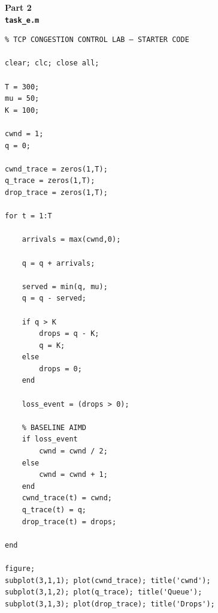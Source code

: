 \documentclass[a4paper,12pt]{article}
\begin{document}
\noindent
\textbf{Part 2}\\
\textbf{\texttt{task\_e.m}}
\begin{lstlisting}
% TCP CONGESTION CONTROL LAB – STARTER CODE

clear; clc; close all;

T = 300;
mu = 50;
K = 100;

cwnd = 1;
q = 0;

cwnd_trace = zeros(1,T);
q_trace = zeros(1,T);
drop_trace = zeros(1,T);

for t = 1:T

    arrivals = max(cwnd,0);

    q = q + arrivals;

    served = min(q, mu);
    q = q - served;

    if q > K
        drops = q - K;
        q = K;
    else
        drops = 0;
    end

    loss_event = (drops > 0);

    % BASELINE AIMD
    if loss_event
        cwnd = cwnd / 2;
    else
        cwnd = cwnd + 1;
    end
    cwnd_trace(t) = cwnd;
    q_trace(t) = q;
    drop_trace(t) = drops;

end

figure;
subplot(3,1,1); plot(cwnd_trace); title('cwnd');
subplot(3,1,2); plot(q_trace); title('Queue');
subplot(3,1,3); plot(drop_trace); title('Drops');
\end{lstlisting}
\end{document}
